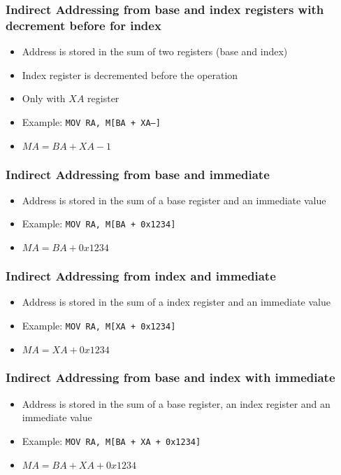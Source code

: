 \begin{frame}
    \frametitle{Indirect Addressing from base and index registers with decrement before for index}
    \begin{itemize}
        \item Address is stored in the sum of two registers (base and index)
        \item Index register is decremented before the operation
        \item Only with $XA$ register
        \item Example: \texttt{MOV RA, M[BA + XA--]}
        \item $MA = BA + XA - 1$
    \end{itemize}
\end{frame}

\begin{frame}
    \frametitle{Indirect Addressing from base and immediate}
    \begin{itemize}
        \item Address is stored in the sum of a base register and an immediate value
        \item Example: \texttt{MOV RA, M[BA + 0x1234]}
        \item $MA = BA + 0x1234$
    \end{itemize}
\end{frame}

\begin{frame}
    \frametitle{Indirect Addressing from index and immediate}
    \begin{itemize}
        \item Address is stored in the sum of a index register and an immediate value
        \item Example: \texttt{MOV RA, M[XA + 0x1234]}
        \item $MA = XA + 0x1234$
    \end{itemize}
\end{frame}

\begin{frame}
    \frametitle{Indirect Addressing from base and index with immediate}
    \begin{itemize}
        \item Address is stored in the sum of a base register, an index register and an immediate value
        \item Example: \texttt{MOV RA, M[BA + XA + 0x1234]}
        \item $MA = BA + XA + 0x1234$
    \end{itemize}
\end{frame}

